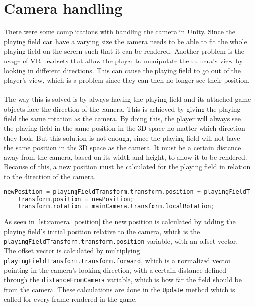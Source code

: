 \section{Camera handling}
There were some complications with handling the camera in Unity.
Since the playing field can have a varying size the camera needs to be able to fit the whole playing field on the screen such that it can be rendered.
Another problem is the usage of VR headsets that allow the player to manipulate the camera's view by looking in different directions.
This can cause the playing field to go out of the player's view, which is a problem since they can then no longer see their position.
\\\\
The way this is solved is by always having the playing field and its attached game objects face the direction of the camera.
This is achieved by giving the playing field the same rotation as the camera.
By doing this, the player will always see the playing field in the same position in the 3D space no matter which direction they look.
But this solution is not enough, since the playing field will not have the same position in the 3D space as the camera.
It must be a certain distance away from the camera, based on its width and height, to allow it to be rendered.
Because of this, a new position must be calculated for the playing field in relation to the direction of the camera.
\begin{lstlisting}[caption={Calculating and setting the position and rotation of the playing field}, captionpos=b,language=C,label={lst:camera_position}]
    newPosition = playingFieldTransform.transform.position + playingFieldTransform.transform.forward * distanceFromCamera;
    transform.position = newPosition;
    transform.rotation = mainCamera.transform.localRotation;
\end{lstlisting}
As seen in \autoref{lst:camera_position} the new position is calculated by adding the playing field's initial position relative to the camera, which is the \texttt{playingFieldTransform.transform.position} variable, with an offset vector.
The offset vector is calculated by multiplying \texttt{playingFieldTransform.transform.forward}, which is a normalized vector pointing in the camera's looking direction, with a certain distance defined through the \texttt{distanceFromCamera} variable, which is how far the field should be from the camera.
These calculations are done in the \texttt{Update} method which is called for every frame rendered in the game.
\\\\
